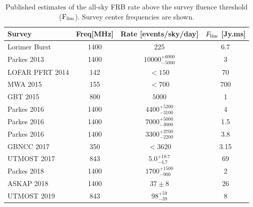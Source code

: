 \documentclass[fleqn,usenatbib]{mnras}
\begin{document}
\begin{table}
\caption{Published estimates of the all-sky FRB rate above the survey fluence threshold ($\rm{F_{lim}}$). Survey center frequencies are shown.}
\label{published rates}
{\renewcommand{\arraystretch}{1.5}%
\begin{tabular}{lccc}
\hline
Survey                              & Freq[MHz]  & Rate [events/sky/day]       & $F_{\rm{lim}}$ [Jy.ms]                                                  \\ \hline
 Lorimer Burst \citep{Lorimer}  & 1400             & 225                       & 6.7                       \\
 Parkes 2013 \citep{parkes2013}     & 1400             & $10000^{+6000}_{-5000}$    & 3                         \\
 LOFAR PFRT 2014 \citep{lofar2014}& 142              & $< 150$                    & 70    \\
 MWA 2015  \citep{mwa2015}      & 155              & $< 700$                      &  700                  	\\
 GBT 2015  \citep{gbt2015}      & 800              & $5000$                    & 1                         \\
 Parkes 2016 \citep{parkes20160} & 1400             & $4400^{+5200}_{-3100}$       & 4                         \\
 Parkes 2016 \citep{parkes20161}     & 1400             & $7000^{+5000}_{-3000}$    & 1.5                       \\
 Parkes 2016   \citep{parkes20162}  & 1400             & $3300^{+3700}_{-2200} $    & 3.8                       \\
 GBNCC 2017 \citep{gbncc2017}   & 350               & $ < 3620$  & 3.15                                         \\
 UTMOST 2017  \citep{utmost2017}   & 843              & $5.0^{+18.7}_{-4.7}$     & 69                        \\
 Parkes 2018  \citep{parkes2018}  & 1400             & $1700^{+1500}_{-900}$      & 2                         \\
 ASKAP 2018    \citep{ascap2018}  & 1400             & $37 \pm 8 $               & 26                    	\\
 UTMOST 2019   \citep{utmost2019}  & 843              & $98^{+59}_{-39}$           & 8                         \\
 \hline
\end{tabular}}
\end{table}
\end{document}
